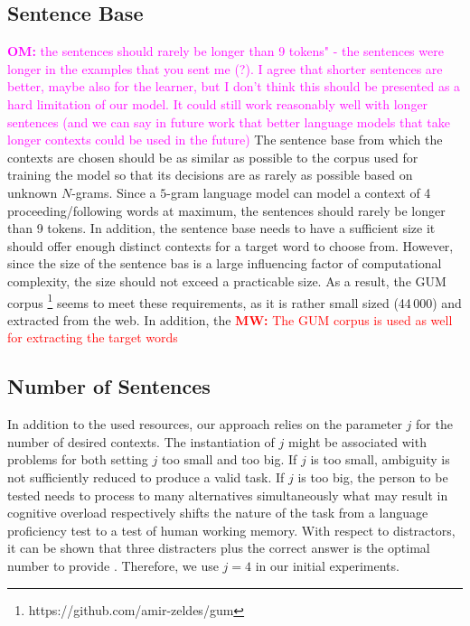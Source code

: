\documentclass[11pt,letterpaper]{article}
\newcommand{\mw}[1]{\textcolor{red}{\textbf{MW:} #1}}
\newcommand{\om}[1]{\textcolor{magenta}{\textbf{OM:} #1}}
\newcommand{\mw}[1]{}
\newcommand{\om}[1]{}
\begin{document}
\subsection{Sentence Base}
\om{the sentences should rarely be longer than 9 tokens" - the sentences were longer in the examples that you sent me (?). I agree that shorter sentences are better, maybe also for the learner, but I don't think this should be presented as a hard limitation of our model. It could still work reasonably well with longer sentences (and we can say in future work that better language models that take longer contexts could be used in the future)}
The sentence base from which the contexts are chosen should be as similar as possible to the corpus used for training the model so that its decisions are as rarely as possible based on unknown $N$-grams. 
Since a $5$-gram language model can model a context of 4 proceeding/following words at maximum, the sentences should rarely be longer than 9 tokens. 
In addition, the sentence base needs to have a sufficient size it should offer enough distinct contexts for a target word to choose from. 
However, since the size of the sentence bas is a large influencing factor of computational complexity, the size should not exceed a practicable size.
As a result, the GUM corpus \cite{zeldesgum}\footnote{https://github.com/amir-zeldes/gum} seems to meet these requirements, as it is rather small sized (44\,000) and extracted from the web. 
In addition, the  
\mw{The GUM corpus is used as well for extracting the target words}

\subsection{Number of Sentences}
In addition to the used resources, our approach relies on the parameter $j$ for the number of desired contexts.
The instantiation of $j$ might be associated with problems for both setting $j$ too small and too big. If $j$ is too small, ambiguity is not sufficiently reduced to produce a valid task.
If $j$ is too big, the person to be tested needs to process to many alternatives simultaneously what may result in cognitive overload respectively shifts the nature of the task from a language proficiency test to a test of human working memory. 
With respect to distractors, it can be shown that three distracters plus the correct answer is the optimal number to provide \cite{graesser2001question}. 
Therefore, we use $j=4$ in our initial experiments. 
\end{document}
